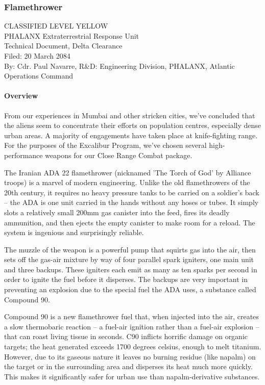 \newpage

\subsubsection*{Flamethrower}
CLASSIFIED LEVEL YELLOW\\
PHALANX Extraterrestrial Response Unit\\
Technical Document, Delta Clearance\\
Filed: 20 March 2084\\
By: Cdr. Paul Navarre, R&D: Engineering Division, PHALANX, Atlantic Operations Command\\
\paragraph*{Overview}
From our experiences in Mumbai and other stricken cities, we've concluded that the aliens seem to concentrate their efforts on population centres, especially dense urban areas. A majority of engagements have taken place at knife-fighting range. For the purposes of the Excalibur Program, we've chosen several high-performance weapons for our Close Range Combat package.

The Iranian ADA 22 flamethrower (nicknamed 'The Torch of God' by Alliance troops) is a marvel of modern engineering. Unlike the old flamethrowers of the 20th century, it requires no heavy pressure tanks to be carried on a soldier's back -- the ADA is one unit carried in the hands without any hoses or tubes. It simply slots a relatively small 200mm gas canister into the feed, fires its deadly ammunition, and then ejects the empty canister to make room for a reload. The system is ingenious and surprisingly reliable.

The muzzle of the weapon is a powerful pump that squirts gas into the air, then sets off the gas-air mixture by way of four parallel spark igniters, one main unit and three backups. These igniters each emit as many as ten sparks per second in order to ignite the fuel before it disperses. The backups are very important in preventing an explosion due to the special fuel the ADA uses, a substance called Compound 90.

Compound 90 is a new flamethrower fuel that, when injected into the air, creates a slow thermobaric reaction -- a fuel-air ignition rather than a fuel-air explosion -- that can roast living tissue in seconds. C90 inflicts horrific damage on organic targets; the heat generated exceeds 1700 degrees celsius, enough to melt titanium. However, due to its gaseous nature it leaves no burning residue (like napalm) on the target or in the surrounding area and disperses its heat much more quickly. This makes it significantly safer for urban use than napalm-derivative substances.


